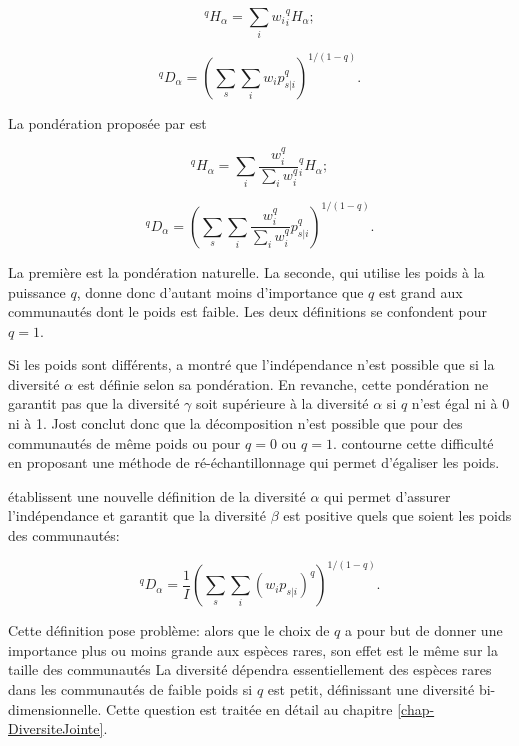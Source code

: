 \documentclass[
  11pt,
  french,
  a4paper,
  extrafontsizes,onecolumn,openright
  ]{memoir}
\begin{document}
\begin{equation}
  \label{eq:RoutledgeHalpha}
  ^{q}\!H_{\alpha} = \sum_i{w_i {^{q}_{i}\!H_{\alpha}}};
\end{equation}

\begin{equation}
  \label{eq:RoutledgeDalpha}
  ^{q}\!D_{\alpha}={\left(\sum_s{\sum_i{w_i p^q_{s|i}}}\right)}^{1/{\left(1-q\right)}}.
\end{equation}

La pondération proposée par \textcite{Jost2007} est

\begin{equation}
  \label{eq:JostHalpha}
  ^{q}\!H_{\alpha} = \sum_i{\frac{w^q_i}{\sum_i{w^q_i}} {^{q}_{i}\!H_{\alpha}}};
\end{equation}

\begin{equation}
  \label{eq:JostDalpha}
  ^{q}\!D_{\alpha} = {\left(\sum_s{\sum_i{\frac{w^q_i}{\sum_i{w^q_i}}p^q_{s|i}}}\right)}^{{1}/{\left(1-q\right)}}.
\end{equation}

La première est la pondération naturelle.
La seconde, qui utilise les poids à la puissance \(q\), donne donc d'autant moins d'importance que \(q\) est grand aux communautés dont le poids est faible.
Les deux définitions se confondent pour \(q=1\).

Si les poids sont différents, \textcite{Jost2007} a montré que l'indépendance n'est possible que si la diversité \(\alpha\) est définie selon sa pondération.
En revanche, cette pondération ne garantit pas que la diversité \(\gamma\) soit supérieure à la diversité \(\alpha\) si \(q\) n'est égal ni à 0 ni à 1.
Jost conclut donc que la décomposition n'est possible que pour des communautés de même poids ou pour \(q=0\) ou \(q=1\).
\textcite{Ricotta2009b} contourne cette difficulté en proposant une méthode de ré-échantillonnage qui permet d'égaliser les poids.

\textcite{Chiu2014} établissent une nouvelle définition de la diversité \(\alpha\) qui permet d'assurer l'indépendance et garantit que la diversité \(\beta\) est positive quels que soient les poids des communautés:

\begin{equation}
  \label{eq:Chiualpha}
  ^{q}\!D_{\alpha}=\frac{1}{I}{\left(\sum_s{\sum_i{{\left(w_ip_{s|i}\right)}^q}}\right)}^{{1}/{\left(1-q\right)}}.
\end{equation}

Cette définition pose problème: alors que le choix de \(q\) a pour but de donner une importance plus ou moins grande aux espèces rares, son effet est le même sur la taille des communautés La diversité dépendra essentiellement des espèces rares dans les communautés de faible poids si \(q\) est petit, définissant une diversité bi-dimensionnelle.
Cette question est traitée en détail au chapitre \ref{chap-DiversiteJointe}.
\end{document}
